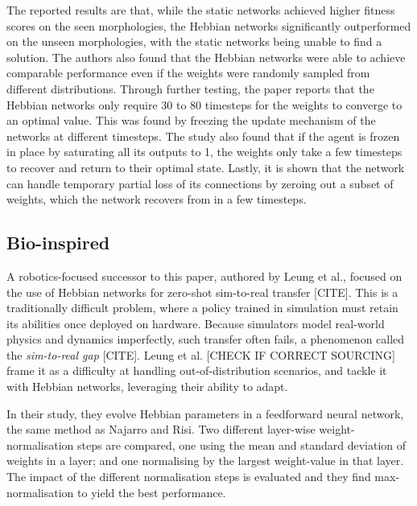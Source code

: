 \documentclass{article} %
\begin{document}
The reported results are that, while the static networks achieved higher fitness scores on the seen morphologies, the Hebbian networks significantly outperformed on the unseen morphologies, with the static networks being unable to find a solution. The authors also found that the Hebbian networks were able to achieve comparable performance even if the weights were randomly sampled from different distributions. Through further testing, the paper reports that the Hebbian networks only require 30 to 80 timesteps for the weights to converge to an optimal value. This was found by freezing the update mechanism of the networks at different timesteps. The study also found that if the agent is frozen in place by saturating all its outputs to 1, the weights only take a few timesteps to recover and return to their optimal state. Lastly, it is shown that the network can handle temporary partial loss of its connections by zeroing out a subset of weights, which the network recovers from in a few timesteps.

\subsection{Bio-inspired}
\label{subsec:bio_inspired}

A robotics-focused successor to this paper, authored by Leung et al., focused on the use of Hebbian networks for zero-shot sim-to-real transfer [CITE]. This is a traditionally difficult problem, where a policy trained in simulation must retain its abilities once deployed on hardware. Because simulators model real-world physics and dynamics imperfectly, such transfer often fails, a phenomenon called the \textit{sim-to-real gap} [CITE]. Leung et al. [CHECK IF CORRECT SOURCING] frame it as a difficulty at handling out-of-distribution scenarios, and tackle it with Hebbian networks, leveraging their ability to adapt. 

In their study, they evolve Hebbian parameters in a feedforward neural network, the same method as Najarro and Risi. Two different layer-wise weight-normalisation steps are compared, one using the mean and standard deviation of weights in a layer; and one normalising by the largest weight-value in that layer. The impact of the different normalisation steps is evaluated and they find max-normalisation to yield the best performance. 
\end{document}
